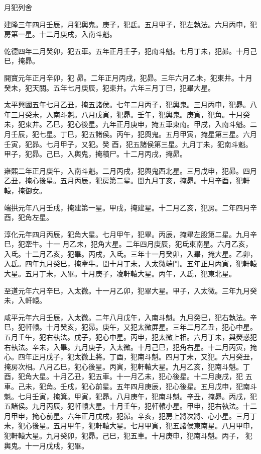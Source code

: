 \begin{pinyinscope}
 月犯列舍



 建隆三年四月壬辰，月犯輿鬼。庚子，犯氐。五月甲子，犯左執法。六月丙申，犯房第一星。十二月庚戌，入南斗魁。



 乾德四年二月癸卯，犯五車。五年正月壬子，犯南斗魁。七月丁未，犯昴。十月己巳，掩昴。



 開寶元年正月辛卯，犯
 昴。二年正月丙戌，犯昴。三年六月乙未，犯東井。十月癸未，犯天關。五年七月庚辰，犯東井。六年三月丁巳，犯畢大星。



 太平興國五年七月乙丑，掩五諸侯。七年二月丙子，犯輿鬼。三月丙申，犯昴。八年三月癸未，入南斗魁。八月戊寅，犯昴。壬午，犯輿鬼。庚寅，犯角。十月癸未，犯東井。乙巳，犯心後星。九年正月庚申，掩五車東南。甲戌，入南斗魁。二月壬辰，犯七星。丁巳，犯五諸侯。丙午，犯輿鬼。五月甲寅，掩星第三星。六月壬寅，犯昴。七月甲子，又犯。癸
 酉，犯五諸侯第三星。九月丁未，犯南斗魁。甲子，犯昴。己巳，入輿鬼，掩積尸。十二月丙戌，掩昴。



 雍熙二年正月庚午，入南斗魁。二月丙戌，犯輿鬼西北星。三月戊申，犯昴。四月乙丑，掩心後星。五月丙辰，犯房第二星。閏九月丁亥，掩昴。十月辛酉，犯軒轅，掩御女。



 端拱元年八月壬戌，掩建第一星。甲戌，掩建星。十二月乙亥，犯房。二年四月辛酉，犯角左星。



 淳化元年四月丙辰，犯角大星。七月甲午，犯畢。丙辰，掩畢左股第二星。九月辛巳，犯牽牛。十一
 月乙未，犯角大星。二年四月庚辰，犯氐東南星。六月乙亥，入氐。十二月乙亥，犯畢。丙戌，入氐。三年十一月癸卯，入畢，掩大星。乙卯，入氐。四年九月癸巳，掩牽牛。閏十月丁未，入太微端門。五年正月丙寅，犯軒轅大星。五月丁未，入畢。十月庚子，凌軒轅大星。丙午，入氐，犯東北星。



 至道元年六月辛巳，入太微。十一月乙卯，犯畢大星。甲子，入太微。三年九月癸未，入軒轅。



 咸平元年六月壬辰，入太微。二年八月戊午，入南斗魁。九月癸巳，犯右執法。辛
 巳，犯軒轅。十月癸亥，犯昴。庚午，又犯太微屏星。三年二月乙丑，犯心中星。五月壬午，犯右執法。戊子，犯心中星。丙申，犯太微上相。六月丁未，與熒惑犯右執法。辛未，入畢。九月庚子，入太微。十月己巳，犯角右星。十二月丙寅，掩心。四年正月戊子，犯太微上將。丁酉，犯南斗魁。四月丁未，又犯。六月癸丑，掩房次相。八月乙巳，犯心後星。丙寅，犯軒轅大星。九月乙亥，犯南斗魁。丁酉，犯角大星。十月乙丑，犯五車。十一月乙未，犯心後星。十二月庚戌，犯
 五車。己未，犯角。壬戌，犯心前星。五年四月庚辰，犯心後星。五月戊申，犯南斗魁。七月壬寅，掩箕。甲寅，犯昴。八月庚午，犯南斗魁。辛丑，掩昴。丙戌，犯五諸侯。九月丙辰，犯軒轅大星。十月壬午，犯軒轅小星。甲申，犯右執法。十二月甲申，掩心前星。六年正月戊戌，犯昴。辛亥，犯房上將次將、心小星。三月丁未，犯心後星。五月甲午，犯軒轅大星。七月甲寅，犯五諸侯東南星。八月甲申，犯軒轅大星。九月癸卯，犯昴。己巳，犯五車。十月庚申，犯南斗魁。丙子，
 犯輿鬼。十一月戊戌，犯畢。




\end{pinyinscope}
